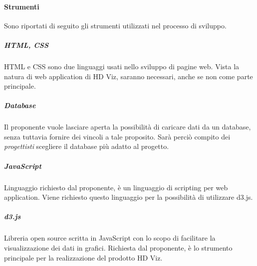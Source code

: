 \documentclass[../norme_di_progetto.tex]{subfiles}
\begin{document}
 \paragraph{Strumenti}
 Sono riportati di seguito gli strumenti utilizzati nel processo di sviluppo.
 
 \subparagraph{HTML, CSS}
 HTML e CSS sono due linguaggi usati nello sviluppo di pagine web. Vista la natura di web application di HD Viz, saranno necessari, anche se non come parte principale.
 
 \subparagraph{Database}
 Il proponente vuole lasciare aperta la possibilità di caricare dati da un database, senza tuttavia fornire dei vincoli a tale proposito. Sarà perciò compito dei \emph{progettisti} scegliere il database più adatto al progetto.
 
 \subparagraph{JavaScript}
 Linguaggio richiesto dal proponente, è un linguaggio di scripting per web application. Viene richiesto questo linguaggio per la possibilità di utilizzare d3.js.
 
 \subparagraph{d3.js}
 Libreria open source scritta in JavaScript con lo scopo di facilitare la visualizzazione dei dati in grafici. Richiesta dal proponente, è lo strumento principale per la realizzazione del prodotto HD Viz.
 
\end{document}
